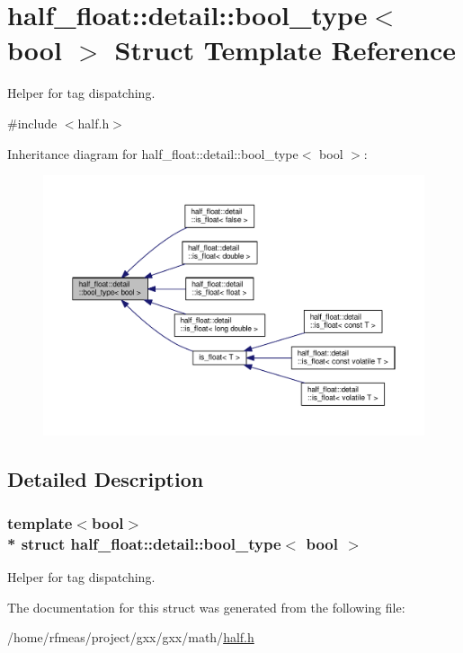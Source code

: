 \hypertarget{structhalf__float_1_1detail_1_1bool__type}{}\section{half\+\_\+float\+:\+:detail\+:\+:bool\+\_\+type$<$ bool $>$ Struct Template Reference}
\label{structhalf__float_1_1detail_1_1bool__type}


Helper for tag dispatching.  




{\ttfamily \#include $<$half.\+h$>$}



Inheritance diagram for half\+\_\+float\+:\+:detail\+:\+:bool\+\_\+type$<$ bool $>$\+:
\nopagebreak
\begin{figure}[H]
\begin{center}
\leavevmode
\includegraphics[width=350pt]{structhalf__float_1_1detail_1_1bool__type__inherit__graph}
\end{center}
\end{figure}


\subsection{Detailed Description}
\subsubsection*{template$<$bool$>$\\*
struct half\+\_\+float\+::detail\+::bool\+\_\+type$<$ bool $>$}

Helper for tag dispatching. 

The documentation for this struct was generated from the following file\+:\begin{DoxyCompactItemize}
\item 
/home/rfmeas/project/gxx/gxx/math/\hyperlink{half_8h}{half.\+h}\end{DoxyCompactItemize}
